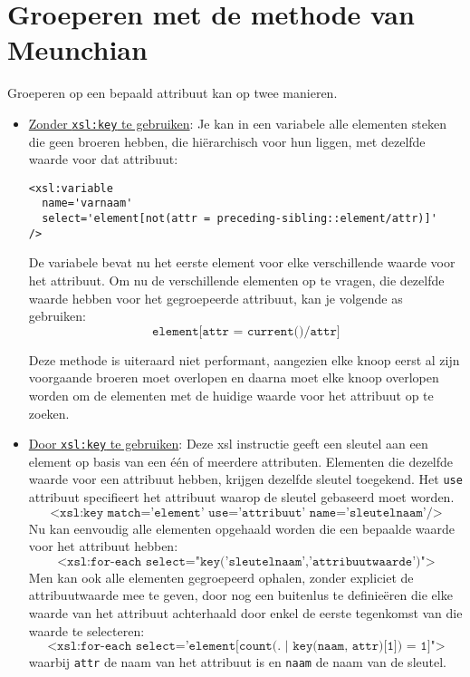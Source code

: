 \documentclass{report}
\begin{document}
	\section{Groeperen met de methode van Meunchian}
	Groeperen op een bepaald attribuut kan op twee manieren. 
	\begin{itemize}
		\item \underline{Zonder \texttt{xsl:key} te gebruiken}: 
			Je kan in een variabele alle elementen steken die geen broeren hebben, die hiërarchisch voor hun liggen, met dezelfde waarde voor dat attribuut:
			\begin{lstlisting}
<xsl:variable 
  name='varnaam' 
  select='element[not(attr = preceding-sibling::element/attr)]'
/>
			\end{lstlisting}
			De variabele bevat nu het eerste element voor elke verschillende waarde voor het attribuut. Om nu de verschillende elementen op te vragen, die dezelfde waarde hebben voor het gegroepeerde attribuut, kan je volgende as gebruiken:
			$$\texttt{element[attr = current()/attr]}$$
			
			Deze methode is uiteraard niet performant, aangezien elke knoop eerst al zijn voorgaande broeren moet overlopen en daarna moet elke knoop overlopen worden om de elementen met de huidige waarde voor het attribuut op te zoeken.
		\item \underline{Door \texttt{xsl:key} te gebruiken}: 
			Deze xsl instructie geeft een sleutel aan een element op basis van een één of meerdere attributen. Elementen die dezelfde waarde voor een attribuut hebben, krijgen dezelfde sleutel toegekend. Het \texttt{use} attribuut specifieert het attribuut waarop de sleutel gebaseerd moet worden.
			$$\texttt{<xsl:key match='element' use='attribuut' name='sleutelnaam'/>}$$
			Nu kan eenvoudig alle elementen opgehaald worden die een bepaalde waarde voor het attribuut hebben:
			$$\texttt{<xsl:for-each select="key('sleutelnaam','attribuutwaarde')">}$$
			Men kan ook alle elementen gegroepeerd ophalen, zonder expliciet de attribuutwaarde mee te geven, door nog een buitenlus te definieëren die elke waarde van het attribuut achterhaald door enkel de eerste tegenkomst van die waarde te selecteren:
			$$\texttt{<xsl:for-each select='element[count(. | key(naam, attr)[1]) = 1]">}$$
			waarbij \texttt{attr} de naam van het attribuut is en \texttt{naam} de naam van de sleutel.


	\end{itemize}
\end{document}
